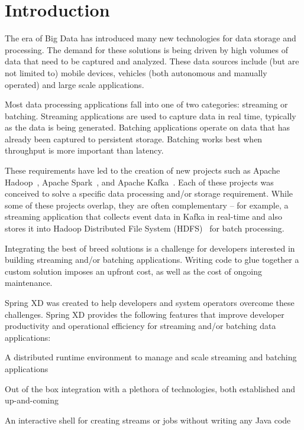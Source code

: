\section{Introduction}

The era of Big Data has introduced many new technologies for data storage
and processing. The demand for these solutions is being driven by high
volumes of data that need to be captured and analyzed. These data sources
include (but are not limited to) mobile devices, vehicles (both autonomous
and manually operated) and large scale applications.

Most data processing applications fall into one of two categories:
streaming or batching. Streaming applications are used to capture data
in real time, typically as the data is being generated. Batching applications
operate on data that has already been captured to persistent storage. Batching
works best when throughput is more important than latency.

These requirements have led to the creation of new projects such as Apache Hadoop~\cite{hadoop},
Apache Spark~\cite{spark}, and Apache Kafka~\cite{kafka}. Each of these projects was conceived
to solve a specific data processing and/or storage requirement. While some
of these projects overlap, they are often complementary -- for example,
a streaming application that collects event data in Kafka in real-time and also 
stores it into Hadoop Distributed File System (HDFS)~\cite{hdfs} for batch processing.

Integrating the best of breed solutions is a challenge for developers
interested in building streaming and/or batching applications. Writing
code to glue together a custom solution imposes an upfront cost,
as well as the cost of ongoing maintenance.

Spring XD was created to help developers and system operators overcome
these challenges. Spring XD provides the following features that improve developer
productivity and operational efficiency for streaming and/or batching
data applications:
\begin{itemize*}
\item A distributed runtime environment to manage and scale streaming and batching applications
\item Out of the box integration with a plethora of technologies, both established
and up-and-coming
\item An interactive shell for creating streams or jobs without writing any Java code
\end{itemize*}

